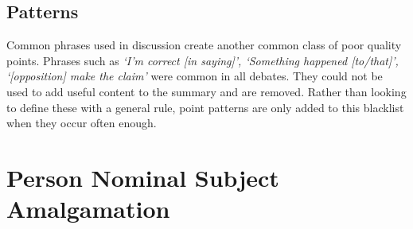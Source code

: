     \subsection{Patterns}
      Common phrases used in discussion create another common class of poor quality points. Phrases such as \textit{`I'm correct [in saying]', `Something happened [to/that]', `[opposition] make the claim'} were common in all debates. They could not be used to add useful content to the summary and are removed. Rather than looking to define these with a general rule, point patterns are only added to this blacklist when they occur often enough.
  \section{Person Nominal Subject Amalgamation}
